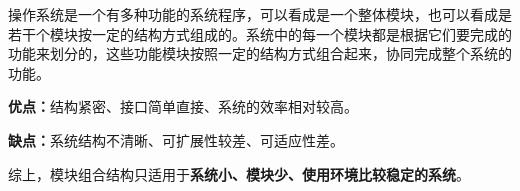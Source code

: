 {操作系统是一个有多种功能的系统程序，可以看成是一个整体模块，也可以看成是若干个模块按一定的结构方式组成的。系统中的每一个模块都是根据它们要完成的功能来划分的，这些功能模块按照一定的结构方式组合起来，协同完成整个系统的功能。}

\textbf{优点：}结构紧密、接口简单直接、系统的效率相对较高。

\textbf{缺点：}系统结构不清晰、可扩展性较差、可适应性差。

综上，模块组合结构只适用于\textbf{{系统小、模块少、使用环境比较稳定的系统}}。
